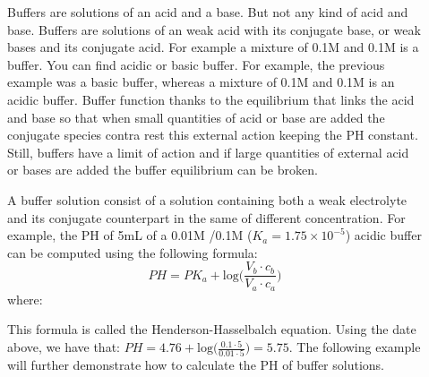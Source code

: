 \documentclass[main.tex]{subfiles}
\newcommand\chapterlabel{acids}
\begin{document}
\begin{description}
\item[] Buffers are solutions of an acid and a base. But not any kind of acid and base. Buffers are solutions of an weak acid with its conjugate base, or weak bases and its conjugate acid. For example a mixture of 0.1M  and 0.1M  is a buffer. You can find acidic or basic buffer. For example, the previous example was a basic buffer, whereas a mixture of 0.1M  and 0.1M  is an acidic buffer. Buffer function thanks to the equilibrium that links the acid and base so that when small quantities of acid or base are added the conjugate species contra rest this external action keeping the PH constant. Still, buffers have a limit of action and if large quantities of external acid or bases are added the buffer equilibrium can be broken.
\item[] A buffer solution consist of a solution containing both a weak electrolyte and its conjugate counterpart in the same of different concentration. For example, the PH of 5mL of a 0.01M /0.1M  ($K_a=1.75 \times 10^{-5}$) acidic buffer can be computed using the following formula:
\begin{equation}
\boxed{ PH=PK_a + \text{log} \Big(\frac{V_b\cdot c_b}{V_a\cdot c_a}\Big) }\label{\chapterlabel:equation16}
\end{equation}
where:
This formula is called the Henderson-Hasselbalch equation. Using the date above, we have that: $PH=4.76 + \text{log}\big( \frac{0.1\cdot 5}{0.01\cdot 5}\big)=5.75$. The following example will further demonstrate how to calculate the PH of buffer solutions.


\end{description}
\end{document}
